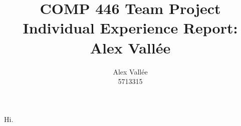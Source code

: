 \documentclass{article}
\author{Alex Vall\'ee\\5713315}
\title{COMP 446 Team Project Individual Experience Report:\\Alex Vall\'ee}
\begin{document}
\maketitle
Hi.
\end{document}
